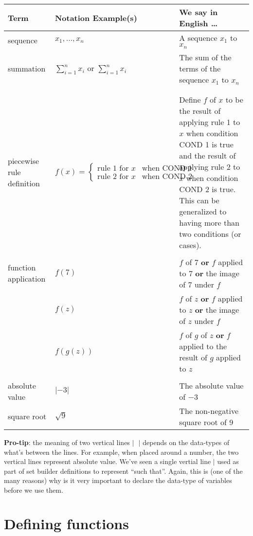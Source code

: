 \documentclass[12pt, oneside]{article}
\begin{document}
\begin{center}
\begin{tabular}{|p{1.2in}p{2.8in}p{3in}|}
\hline
{\bf Term} & {\bf Notation Example(s)} & {\bf We say in English \ldots } \\
\hline
sequence & $x_1, \ldots, x_n$ & A sequence $x_1$ to $x_n$ \\
summation & $\sum_{i=1}^n x_i$ or $\displaystyle{\sum_{i=1}^n x_i}$ & The sum of the terms of the sequence $x_1$ to $x_n$ \\
&&\\
&&\\
piecewise rule definition & $f(x) = \begin{cases} \text{rule 1 for } x & \text{when~COND 1} \\ \text{rule 2 for } x & \text{when COND 2}\end{cases}$ &
Define $f$ of $x$ to be the result of applying rule 1 to $x$ when condition COND 1 is true and the result of 
applying rule 2 to $x$ when condition COND 2 is true. This can be generalized to having more than two conditions
(or cases).\\
&&\\
function application & $f(7)$ & $f$ of $7$ {\bf or} $f$ applied to $7$ {\bf or} the image of $7$ under $f$\\
                     & $f(z)$ & $f$ of $z$ {\bf or} $f$ applied to $z$ {\bf or} the image of $z$ under $f$\\
                     & $f(g(z))$ & $f$ of $g$ of $z$ {\bf or} $f$ applied to the result of $g$ applied to $z$ \\
&&\\
absolute value & $\lvert -3 \rvert$ & The absolute value of $-3$ \\
square root & $\sqrt{9}$ & The non-negative square root of $9$ \\


\hline
\end{tabular}
\end{center}

{\bf Pro-tip}: the meaning of two vertical lines $| ~~~ |$ depends on the data-types of what's between the lines.
For example, when placed around a number, the two vertical lines represent absolute value.
We've seen a single vertial line $|$ used as part of set builder definitions to represent ``such that''.
Again, this is 
(one of the many reasons) why is it very important to declare the data-type of variables before we use them.
 \vfill
\section*{Defining functions}
\end{document}
